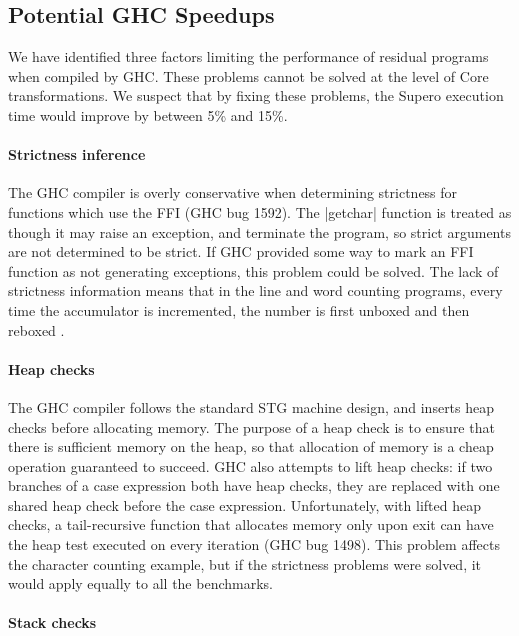 \subsection{Potential GHC Speedups}

We have identified three factors limiting the performance of residual programs when compiled by GHC. These problems cannot be solved at the level of Core transformations. We suspect that by fixing these problems, the Supero execution time would improve by between 5\% and 15\%.

\paragraph{Strictness inference}

The GHC compiler is overly conservative when determining strictness for functions which use the FFI (GHC bug 1592). The |getchar| function is treated as though it may raise an exception, and terminate the program, so strict arguments are not determined to be strict. If GHC provided some way to mark an FFI function as not generating exceptions, this problem could be solved. The lack of strictness information means that in the line and word counting programs, every time the accumulator is incremented, the number is first unboxed and then reboxed \cite{spj:unboxing}.

\paragraph{Heap checks}

The GHC compiler follows the standard STG machine \cite{spj:stg} design, and inserts heap checks before allocating memory. The purpose of a heap check is to ensure that there is sufficient memory on the heap, so that allocation of memory is a cheap operation guaranteed to succeed. GHC also attempts to lift heap checks: if two branches of a case expression both have heap checks, they are replaced with one shared heap check before the case expression. Unfortunately, with lifted heap checks, a tail-recursive function that allocates memory only upon exit can have the heap test executed on every iteration (GHC bug 1498). This problem affects the character counting example, but if the strictness problems were solved, it would apply equally to all the benchmarks.

\paragraph{Stack checks}

